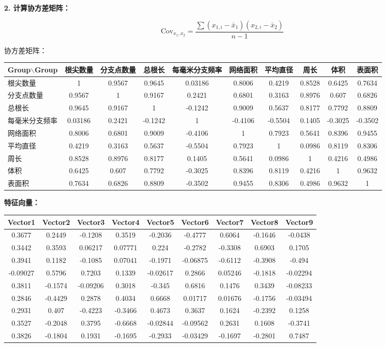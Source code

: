 \documentclass[10.5pt]{config}
\begin{document}
\textbf{2. 计算协方差矩阵：}

\[
\text{Cov}_{x_1,x_2} = \frac{\sum (x_{1,i} - \bar{x}_1)(x_{2,i} - \bar{x}_2)}{n - 1}
\]

协方差矩阵：

\begin{tabular}{p{1.85cm} *{9}{c}}
\hline
\rowcolor{blue!20}
Group$\backslash$Group & 根尖数量 & 分支点数量 & 总根长 & 每毫米分支频率 & 网络面积 & 平均直径 & 周长 & 体积 & 表面积 \\
\hline
根尖数量 & 1 & 0.9567 & 0.9645 & 0.03186 & 0.8006 & 0.4219 & 0.8528 & 0.6425 & 0.7634 \\
分支点数量 & 0.9567 & 1 & 0.9167 & 0.2421 & 0.6801 & 0.3163 & 0.8976 & 0.607 & 0.6826 \\
总根长 & 0.9645 & 0.9167 & 1 & -0.1242 & 0.9009 & 0.5637 & 0.8177 & 0.7792 & 0.8809 \\
每毫米分支频率 & 0.03186 & 0.2421 & -0.1242 & 1 & -0.4106 & -0.5504 & 0.1405 & -0.3025 & -0.3502 \\
网络面积 & 0.8006 & 0.6801 & 0.9009 & -0.4106 & 1 & 0.7923 & 0.5641 & 0.8396 & 0.9455 \\
平均直径 & 0.4219 & 0.3163 & 0.5637 & -0.5504 & 0.7923 & 1 & 0.0986 & 0.8119 & 0.8306 \\
周长 & 0.8528 & 0.8976 & 0.8177 & 0.1405 & 0.5641 & 0.0986 & 1 & 0.4216 & 0.4986 \\
体积 & 0.6425 & 0.607 & 0.7792 & -0.3025 & 0.8396 & 0.8119 & 0.4216 & 1 & 0.9632 \\
表面积 & 0.7634 & 0.6826 & 0.8809 & -0.3502 & 0.9455 & 0.8306 & 0.4986 & 0.9632 & 1 \\
\hline
\end{tabular}

\textbf{特征向量：}

\begin{tabular}{*{9}{c}}
\hline
\rowcolor{blue!20}
Vector1 & Vector2 & Vector3 & Vector4 & Vector5 & Vector6 & Vector7 & Vector8 & Vector9 \\
\hline
0.3677 & 0.2449 & -0.1208 & 0.3519 & -0.2036 & -0.4777 & 0.6064 & -0.1646 & -0.0438 \\
0.3442 & 0.3593 & 0.06217 & 0.07771 & 0.224 & -0.2782 & -0.3308 & 0.6903 & 0.1705 \\
0.3941 & 0.1182 & -0.1085 & 0.07041 & -0.1971 & -0.06875 & -0.6112 & -0.3908 & -0.494 \\
-0.09027 & 0.5796 & 0.7203 & 0.1339 & -0.02617 & 0.2866 & 0.05246 & -0.1818 & -0.02294 \\
0.3811 & -0.1574 & -0.09206 & 0.3018 & -0.345 & 0.6816 & 0.1476 & 0.3439 & -0.08233 \\
0.2846 & -0.4429 & 0.2878 & 0.4034 & 0.6668 & 0.01717 & 0.01676 & -0.1756 & -0.03494 \\
0.2931 & 0.407 & -0.4223 & -0.3466 & 0.4673 & 0.3637 & 0.1624 & -0.2392 & 0.1258 \\
0.3527 & -0.2048 & 0.3795 & -0.6668 & -0.02844 & -0.09562 & 0.2631 & 0.1608 & -0.3741 \\
0.3826 & -0.1804 & 0.1931 & -0.1695 & -0.2933 & -0.03429 & -0.1697 & -0.2801 & 0.7487 \\
\hline
\end{tabular}
\end{document}
